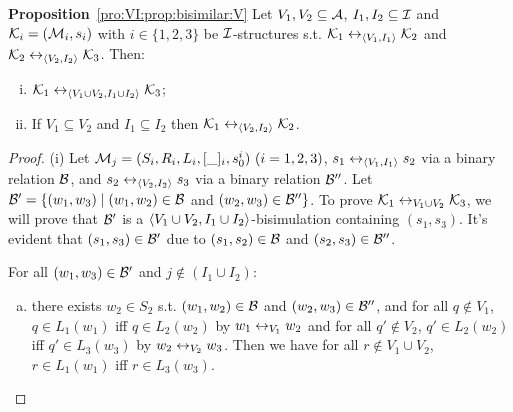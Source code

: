 \documentclass[twoside,11pt]{article}
\begin{document}
	\noindent\textbf{Proposition}~\ref{pro:VI:prop:bisimilar:V}
	Let $V_1,V_2\subseteq\cal A$, $I_1, I_2 \subseteq {\cal I}$
	and ${\cal K}_i=({\cal M}_i,s_i)$ with $i\in \{1,2,3\}$ be ${\cal I}$-structures
	s.t.
	${\cal K}_1\leftrightarrow_{{\langle{V_1, I_1}\rangle}}{\cal K}_2$ and ${\cal K}_2\leftrightarrow_{{\langle{V_2,I_2}\rangle}}{\cal K}_3$.
	Then:
	\begin{enumerate}[(i)]
		\item ${\cal K}_1\leftrightarrow_{{\langle{V_1\cup V_2, I_1 \cup I_2}\rangle}}{\cal K}_3$;
		\item If $V_1 \subseteq V_2$ and $I_1 \subseteq I_2$ then ${\cal K}_1 \leftrightarrow_{{\langle{V_2, I_2}\rangle}} {\cal K}_2$.
	\end{enumerate}
	\begin{proof}
		(i) Let ${\cal M}_j=(S_i,R_i,L_i,[\_]_i,s_0^i)~(i=1,2,3)$, $s_1 \leftrightarrow_{\langle{V_1, I_1}\rangle} s_2$ via a binary relation ${\cal B}$, and $s_2 \leftrightarrow_{\langle{V_2, I_2}\rangle} s_3$ via a binary relation ${\cal B}''$. Let ${\cal B}' = \{(w_1, w_3)\mid (w_1, w_2)\in {\cal B}$ and $(w_2, w_3)\in {\cal B}''\}$. To prove ${\cal K}_1\leftrightarrow_{V_1\cup V_2}{\cal K}_3$, we will prove that ${\cal B}'$ is a  ${\langle{V_1 \cup V_2, I_1\cup I_2}\rangle}$-bisimulation containing $(s_1, s_3)$. It's evident that $(s_1, s_3) \in {\cal B}'$ due to $(s_1,s_2)\in {\cal B}$ and $(s_2, s_3)\in {\cal B}''$.
		
		For all $(w_1, w_3) \in {\cal B}'$ and $j \not \in (I_1 \cup I_2)$:
		\begin{enumerate}[(a)]
			\item there exists $w_2 \in S_2$ s.t.  $(w_1,w_2)\in {\cal B}$ and $(w_2, w_3)\in {\cal B}''$, and for all $q \notin V_1$, $q \in L_1(w_1)$ iff $q \in L_2(w_2)$ by $w_1 \leftrightarrow_{V_1} w_2$ and for all $q' \notin V_2$, $q'\in L_2(w_2)$ iff $q'\in L_3(w_3)$ by $w_2 \leftrightarrow_{V_2} w_3$. Then we have for all $r\notin V_1 \cup V_2$, $r \in L_1(w_1)$ iff $r \in L_3(w_3)$.
			

\end{enumerate}
\end{proof}
\end{document}
